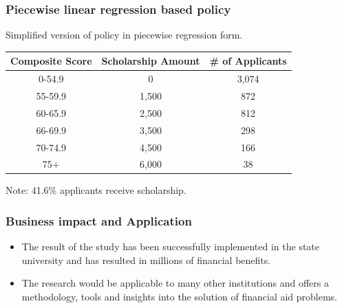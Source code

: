 \documentclass[aspectratio=169]{beamer}
\begin{document}
\begin{frame}
\frametitle{Piecewise linear regression based policy}
Simplified version of policy in piecewise regression form.
\begin{table}[H]
\centering
\begin{tabular}{|c|c|c|} \hline
Composite Score & Scholarship Amount & \# of Applicants \\ \hline
0-54.9          & 0        & 3,074       \\ \hline
55-59.9         & 1,500    & 872         \\ \hline
60-65.9         & 2,500    & 812         \\ \hline
66-69.9         & 3,500    & 298         \\ \hline
70-74.9         & 4,500    & 166          \\ \hline
75+             & 6,000    & 38         \\ \hline
\end{tabular}
\end{table}
Note: 41.6\% applicants receive scholarship.
\end{frame}


\begin{frame}
\frametitle{Business impact and Application}
\begin{itemize}
\item  The result of the study has been successfully implemented in the 
state university and has resulted in millions of financial benefits. 
\item The research would be applicable to many other institutions and 
offers a methodology, tools and insights into the solution of financial aid 
problems. 

\end{itemize}

\end{frame}
\end{document}
